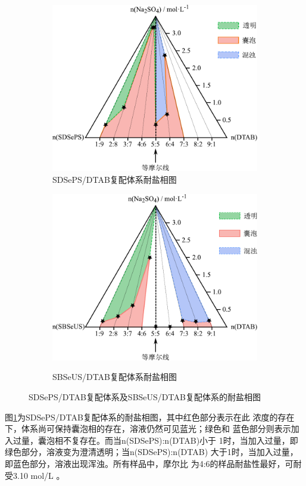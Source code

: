 \documentclass[bachelor,winfonts,replaceperiod]{jnuthesis}
\begin{document}
    \begin{figure}[htbp]
        \centering
        \begin{subfigure}[]{\textwidth}
            \centering
            \includegraphics[width=0.52\linewidth]{figure/SDSePS-salt.pdf}
            \caption{SDSePS/DTAB复配体系耐盐相图}\label{fig:SDSePS-salt}
        \end{subfigure}%

        \begin{subfigure}[]{\textwidth}
            \centering
            \includegraphics[width=0.52\linewidth]{figure/SBSeUS-salt.pdf}\\
            \caption{SBSeUS/DTAB复配体系耐盐相图}\label{fig:SBSeUS-salt}
        \end{subfigure}%
        \caption{SDSePS/DTAB复配体系及SBSeUS/DTAB复配体系的耐盐相图}
        \label{fig:耐盐相图}
    \end{figure}

    图\ref{fig:SDSePS-salt}为SDSePS/DTAB复配体系的耐盐相图，其中红色部分表示在此
    浓度的存在下，体系尚可保持囊泡相的存在，溶液仍然可见蓝光；绿色和
    蓝色部分则表示加入过量，囊泡相不复存在。而当n(SDSePS):n(DTAB)小于
    1时，当加入过量，即绿色部分，溶液变为澄清透明；当n(SDSePS):n(DTAB)
    大于1时，当加入过量，即蓝色部分，溶液出现浑浊。所有样品中，摩尔比
    为4:6的样品耐盐性最好，可耐受3.10 mol/L 。
    
\end{document}

